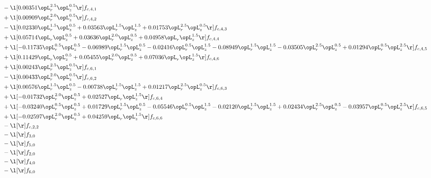 \begin{alignat}{2}
& - \l[  0.00351 \opL_r^{2.5} \opL_z^{0.5}  \r] f_{c,4,1} \nonumber \\ 
& + \l[  0.00909 \opL_r^{2.0} \opL_z^{0.5}  \r] f_{c,4,2} \nonumber \\ 
& - \l[  0.02330 \opL_r^{1.5} \opL_z^{0.5} +  0.03563 \opL_r^{1.5} \opL_z^{1.5} +  0.01753 \opL_r^{2.5} \opL_z^{0.5}  \r] f_{c,4,3} \nonumber \\ 
& + \l[  0.05714 \opL_r \opL_z^{0.5} +  0.03636 \opL_r^{2.0} \opL_z^{0.5} +  0.04958 \opL_r \opL_z^{1.5}  \r] f_{c,4,4} \nonumber \\ 
& + \l[  -0.11735 \opL_r^{0.5} \opL_z^{0.5}   -0.06989 \opL_r^{1.5} \opL_z^{0.5}   -0.02416 \opL_r^{0.5} \opL_z^{1.5}   -0.08949 \opL_r^{1.5} \opL_z^{1.5}   -0.03505 \opL_r^{2.5} \opL_z^{0.5} +  0.01294 \opL_r^{0.5} \opL_z^{2.5}  \r] f_{c,4,5} \nonumber \\ 
& + \l[  0.11429 \opL_r \opL_z^{0.5} +  0.05455 \opL_r^{2.0} \opL_z^{0.5} +  0.07036 \opL_r \opL_z^{1.5}  \r] f_{c,4,6} \nonumber \\ 
& + \l[  0.00243 \opL_r^{2.5} \opL_z^{0.5}  \r] f_{c,6,1} \nonumber \\ 
& - \l[  0.00433 \opL_r^{2.0} \opL_z^{0.5}  \r] f_{c,6,2} \nonumber \\ 
& + \l[  0.00576 \opL_r^{1.5} \opL_z^{0.5}   -0.00738 \opL_r^{1.5} \opL_z^{1.5} +  0.01217 \opL_r^{2.5} \opL_z^{0.5}  \r] f_{c,6,3} \nonumber \\ 
& + \l[  -0.01732 \opL_r^{2.0} \opL_z^{0.5} +  0.02527 \opL_r \opL_z^{1.5}  \r] f_{c,6,4} \nonumber \\ 
& + \l[  -0.03240 \opL_r^{0.5} \opL_z^{0.5} +  0.01729 \opL_r^{1.5} \opL_z^{0.5}   -0.05546 \opL_r^{0.5} \opL_z^{1.5}   -0.02120 \opL_r^{1.5} \opL_z^{1.5} +  0.02434 \opL_r^{2.5} \opL_z^{0.5}   -0.03957 \opL_r^{0.5} \opL_z^{2.5}  \r] f_{c,6,5} \nonumber \\ 
& + \l[  -0.02597 \opL_r^{2.0} \opL_z^{0.5} +  0.04259 \opL_r \opL_z^{1.5}  \r] f_{c,6,6} \nonumber \\ 
& - \l[  \r] f_{c,2,2} \nonumber \\ 
& - \l[  \r] f_{3,0} \nonumber \\ 
& - \l[  \r] f_{5,0} \nonumber \\ 
& - \l[  \r] f_{2,0} \nonumber \\ 
& - \l[  \r] f_{4,0} \nonumber \\ 
& - \l[  \r] f_{6,0} \nonumber \\ 
\end{alignat} 


